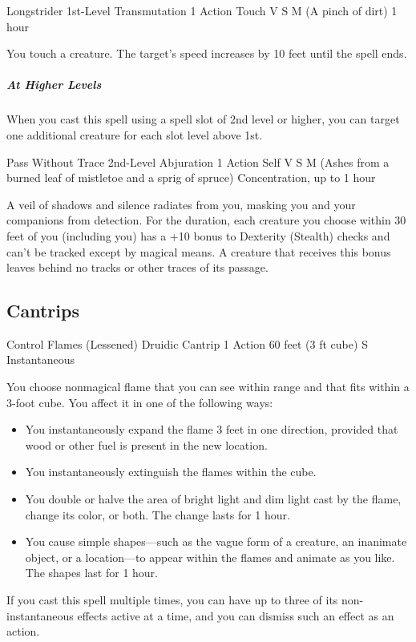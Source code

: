 \documentclass[letterpaper,openany,oneside,twocolumn]{book}
\begin{document}
\DndSpellHeader
  {Longstrider}
  {1st-Level Transmutation}
  {1 Action}
  {Touch}
  {V S M (A pinch of dirt)}
  {1 hour}

You touch a creature. The target's speed increases by 10 feet until the spell ends.

\subparagraph*{At Higher Levels} When you cast this spell using a spell slot of 2nd level or higher, you can target one additional creature for each slot level above 1st.

\DndSpellHeader
  {Pass Without Trace}
  {2nd-Level Abjuration}
  {1 Action}
  {Self}
  {V S M (Ashes from a burned leaf of mistletoe and a sprig of spruce)}
  {Concentration, up to 1 hour}

A veil of shadows and silence radiates from you, masking you and your companions from detection. For the duration, each creature you choose within 30 feet of you (including you) has a +10 bonus to Dexterity (Stealth) checks and can't be tracked except by magical means. A creature that receives this bonus leaves behind no tracks or other traces of its passage.

\subsection*{Cantrips}

\DndSpellHeader
  {Control Flames (Lessened)}
  {Druidic Cantrip}
  {1 Action}
  {60 feet (3 ft cube)}
  {S}
  {Instantaneous}

You choose nonmagical flame that you can see within range and that fits within a 3-foot cube. You affect it in one of the following ways:
\begin{itemize}
	\item You instantaneously expand the flame 3 feet in one direction, provided that wood or other fuel is present in the new location.
	\item You instantaneously extinguish the flames within the cube.
	\item You double or halve the area of bright light and dim light cast by the flame, change its color, or both. The change lasts for 1 hour.
	\item You cause simple shapes—such as the vague form of a creature, an inanimate object, or a location—to appear within the flames and animate as you like. The shapes last for 1 hour.
\end{itemize}
If you cast this spell multiple times, you can have up to three of its non-instantaneous effects active at a time, and you can dismiss such an effect as an action.
\end{document}
